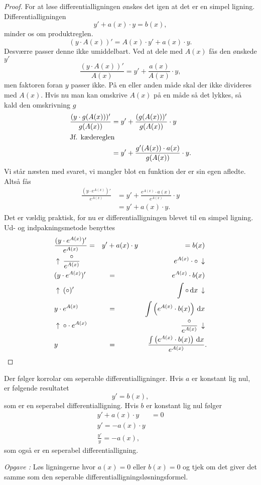 \documentclass{article}
\newcounter{opgavecnt}
\newcommand{\opg}[1]{\stepcounter{opgavecnt}\textit{Opgave \arabic{opgavecnt}: }#1}
\begin{document}
\begin{proof}
    For at løse differentialligningen ønskes det igen at det er en simpel
    ligning. Differentialligningen
    \[
        y' + a(x) \cdot y = b(x),
    \] 
    minder os om produktreglen.
    \[
        (y \cdot A(x))' = A(x) \cdot y' + a(x) \cdot y.
    \] 
    Desværre passer denne ikke umiddelbart. Ved at dele med $A(x)$ fås den ønskede $y'$
    \[
        \frac{(y \cdot A(x))'}{A(x)} = y' + \frac{a(x)}{A(x)} \cdot y,
    \]
    men faktoren foran $y$ passer ikke.
    På en eller anden måde skal der ikke divideres med $A(x)$. Hvis nu man kan
    omskrive $A(x)$ på en måde så det lykkes, så kald den omskrivning $g$
    \begin{align*}
        \frac{(y \cdot g(A(x)))'}{g(A(x))} &= y' + \frac{(g(A(x)))'}{g(A(x))} \cdot y\\
        \intertext{Jf. kædereglen}
                                           &= y' + \frac{g'(A(x)) \cdot a(x)}{g(A(x))} \cdot y.
    \end{align*}
    Vi står næsten med svaret, vi mangler blot en funktion der er sin egen
    afledte. Altså fås
    \begin{align*}
        \frac{(y \cdot e^{A(x)})'}{e^{A(x)}} &= y' + \frac{e^{A(x)} \cdot a(x)}{e^{A(x)}} \cdot y\\
                                             &= y' + a(x) \cdot y.
    \end{align*}
    Det er vældig praktisk, for nu er differentialligningen blevet til en
    simpel ligning. Ud- og indpakningsmetode benyttes
    \begin{align*}
        &\frac{(y \cdot e^{A(x)})'}{e^{A(x)}} =& y' &+ a(x) \cdot y &= b(x)&\\
        &\uparrow\: \frac{\circ}{e^{A(x)}} &&& e^{A(x)} \cdot \circ \: \downarrow&\\
        &(y \cdot e^{A(x)})' &&=& e^{A(x)} \cdot b(x)&\\
        &\uparrow\: ( \circ )' &&& \int \circ \,\mathrm{d} x \: \downarrow&\\
        &y \cdot e^{A(x)} &&=& \int \left(e^{A(x)} \cdot b(x)\right) \,\mathrm{d} x&\\
        &\uparrow\: \circ \cdot e^{A(x)} &&& \frac{\circ}{e^{A(x)}} \: \downarrow&\\
        &y &&=& \frac{\int \left(e^{A(x)} \cdot b(x)\right) \,\mathrm{d} x}{e^{A(x)}}&.\qedhere
    \end{align*}
\end{proof}

Der følger korrolar om seperable differentialligninger. Hvis $a$ er konstant
lig nul, er følgende resultatet
\[
    y' = b(x),
\] 
som er en seperabel differentialligning. Hvis $b$ er konstant lig nul følger
\begin{align*}
    y' + a(x) \cdot y &= 0\\
    y' = -a(x) \cdot y\\
    \frac{y'}{y} = -a(x),
\end{align*}
som også er en seperabel differentialligning.

\opg{Løs ligningerne hvor $a(x) = 0$ eller $b(x) = 0$ og tjek om det giver det
samme som den seperable differentialligningsløsningsformel.}

\printindex
\end{document}
